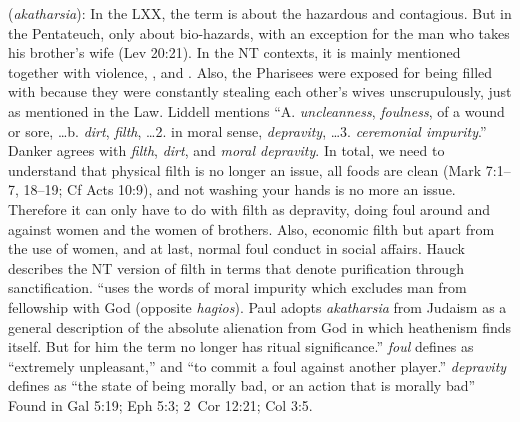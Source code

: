\item[Depravity,]

(\textit{akatharsia}):
In the LXX, the term is about the hazardous and contagious. But in the Pentateuch, only about bio-hazards, with an exception for the man who takes his brother's wife (Lev 20:21). In the NT contexts, it is mainly mentioned together with  violence, , and . Also, the Pharisees were exposed for being filled with  because they were constantly stealing each other's wives unscrupulously, just as mentioned in the Law. Liddell mentions ``A. \emph{uncleanness}, \emph{foulness}, of a wound or sore, \ldots b. \emph{dirt}, \emph{filth}, \ldots 2. in moral sense, \emph{depravity}, \ldots 3. \emph{ceremonial impurity}.'' Danker agrees with \emph{filth}, \emph{dirt}, and \emph{moral depravity}. In total, we need to understand that physical filth is no longer an issue, all foods are clean (Mark 7:1--7, 18--19; Cf Acts 10:9), and not washing your hands is no more an issue. Therefore it can only have to do with filth as depravity, doing foul around and against women and the women of brothers. Also, economic filth but apart from the use of women, and at last, normal foul conduct in social affairs. Hauck describes the NT version of filth in terms that denote purification through sanctification. ``uses the words of moral impurity which excludes man from fellowship with God (opposite \emph{hagios}). Paul adopts \emph{akatharsia} from Judaism as a general description of the absolute alienation from God in which heathenism finds itself. But for him the term no longer has ritual significance.'' \emph{foul} defines as ``extremely unpleasant,'' and ``to commit a foul against another player.'' \emph{depravity} defines as ``the state of being morally bad, or an action that is morally bad''
Found in Gal 5:19; Eph 5:3; 2~Cor 12:21; Col 3:5.
